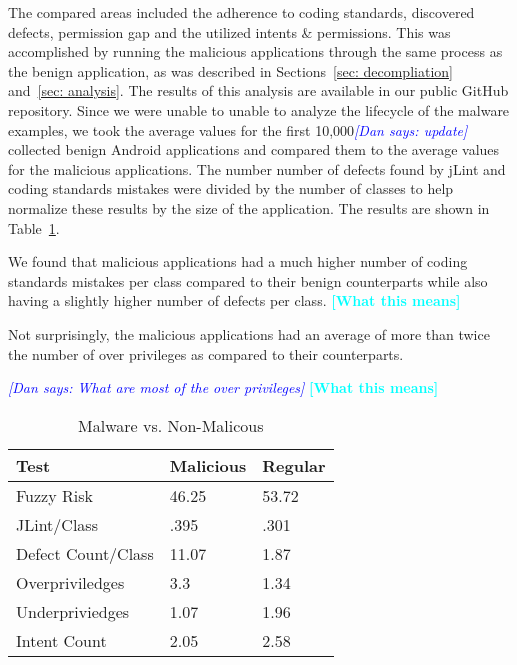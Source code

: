 \documentclass{sig-alternate}
\newcommand{\todo}[1]{\textcolor{cyan}{\textbf{[#1]}}}
\newcommand{\dan}[1]{\textcolor{blue}{{\it [Dan says: #1]}}}
\begin{document}
The compared areas included the adherence to coding standards, discovered defects, permission gap and the utilized intents \& permissions. This was accomplished by running the malicious applications through the same process as the benign application, as was described in Sections~\ref{sec: decompliation} and~\ref{sec: analysis}. The results of this analysis are available in our public GitHub repository. Since we were unable to unable to analyze the lifecycle of the malware examples, we took the average values for the first 10,000\dan{update} collected benign Android applications and compared them to the average values for the malicious applications. The number number of defects found by jLint and coding standards mistakes were divided by the number of classes to help normalize these results by the size of the application. The results are shown in Table~\ref{Table:maliciousvsnonmalicious}.


We found that malicious applications had a much higher number of coding standards mistakes per class compared to their benign counterparts while also having a slightly higher number of defects per class. \todo{What this means}


Not surprisingly, the malicious applications had an average of more than twice the number of over privileges as compared to their counterparts.

\dan{What are most of the over privileges}
\todo{What this means}


\begin{center}

\begin{table}[ht]
\caption{Malware vs. Non-Malicous}
\label{Table:maliciousvsnonmalicious}
  \begin{tabular}{ l | l | l }

     \bfseries Test  & \bfseries Malicious & \bfseries Regular \\ \hline
    Fuzzy Risk & 46.25 & 53.72 \\ \hline
    JLint/Class & .395 & .301 \\ \hline
    Defect Count/Class & 11.07 & 1.87 \\ \hline
    Overpriviledges & 3.3 & 1.34 \\ \hline
    Underpriviedges & 1.07 & 1.96 \\ \hline
    Intent Count & 2.05 & 2.58 \\
  \end{tabular}
\end{table}
\end{center}
\end{document}
